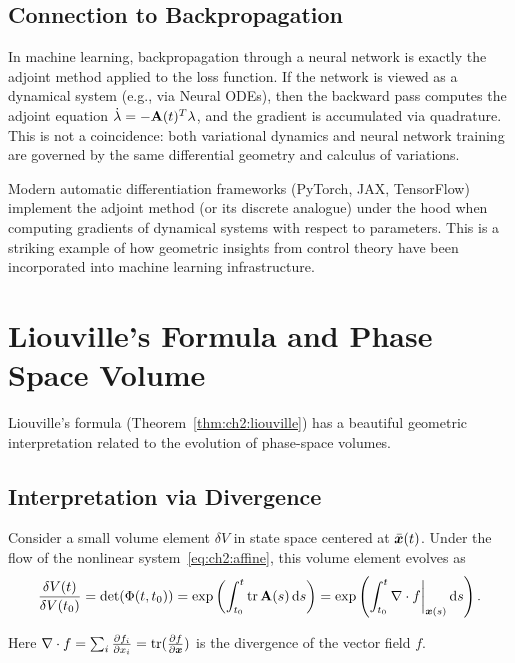\subsection{Connection to Backpropagation}

In machine learning, backpropagation through a neural network is exactly the adjoint method applied to
the loss function. If the network is viewed as a dynamical system (e.g., via Neural ODEs), then
the backward pass computes the adjoint equation $\dot\lambda = -\mathbf{A}(t)^T\lambda$, and the gradient is
accumulated via quadrature. This is not a coincidence: both variational dynamics and neural network training
are governed by the same differential geometry and calculus of variations.

\begin{remark}
Modern automatic differentiation frameworks (PyTorch, JAX, TensorFlow) implement the adjoint method
(or its discrete analogue) under the hood when computing gradients of dynamical systems with respect
to parameters. This is a striking example of how geometric insights from control theory have been
incorporated into machine learning infrastructure.
\end{remark}


\section{Liouville's Formula and Phase Space Volume}

Liouville's formula (Theorem~\ref{thm:ch2:liouville}) has a beautiful geometric interpretation related
to the evolution of phase-space volumes.

\subsection{Interpretation via Divergence}

Consider a small volume element $\delta V$ in state space centered at $\bar{\bm{x}}(t)$. Under the flow of the
nonlinear system~\eqref{eq:ch2:affine}, this volume element evolves as
\begin{equation}
\frac{\delta V(t)}{\delta V(t_0)} = \det(\Phi(t,t_0)) = \exp\left(\int_{t_0}^{t}\operatorname{tr}\mathbf{A}(s)\,\mathrm{d} s\right)
= \exp\left(\int_{t_0}^{t}\nabla \cdot f\bigg|_{\bm{x}(s)}\,\mathrm{d} s\right).
\label{eq:ch2:volume-evolution}
\end{equation}

Here $\nabla \cdot f = \sum_i \frac{\partial f_i}{\partial x_i} = \operatorname{tr}(\frac{\partial f}{\partial \bm{x}})$ is the
divergence of the vector field $f$.

